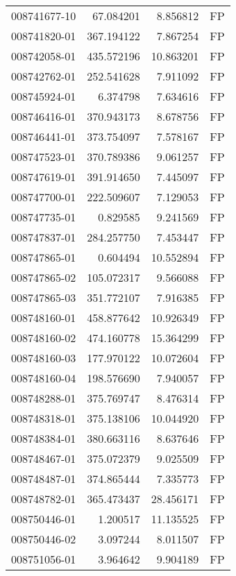 \begin{tabular}{lrrl}
008741677-10 &   67.084201 &       8.856812 &   FP \\
008741820-01 &  367.194122 &       7.867254 &   FP \\
008742058-01 &  435.572196 &      10.863201 &   FP \\
008742762-01 &  252.541628 &       7.911092 &   FP \\
008745924-01 &    6.374798 &       7.634616 &   FP \\
008746416-01 &  370.943173 &       8.678756 &   FP \\
008746441-01 &  373.754097 &       7.578167 &   FP \\
008747523-01 &  370.789386 &       9.061257 &   FP \\
008747619-01 &  391.914650 &       7.445097 &   FP \\
008747700-01 &  222.509607 &       7.129053 &   FP \\
008747735-01 &    0.829585 &       9.241569 &   FP \\
008747837-01 &  284.257750 &       7.453447 &   FP \\
008747865-01 &    0.604494 &      10.552894 &   FP \\
008747865-02 &  105.072317 &       9.566088 &   FP \\
008747865-03 &  351.772107 &       7.916385 &   FP \\
008748160-01 &  458.877642 &      10.926349 &   FP \\
008748160-02 &  474.160778 &      15.364299 &   FP \\
008748160-03 &  177.970122 &      10.072604 &   FP \\
008748160-04 &  198.576690 &       7.940057 &   FP \\
008748288-01 &  375.769747 &       8.476314 &   FP \\
008748318-01 &  375.138106 &      10.044920 &   FP \\
008748384-01 &  380.663116 &       8.637646 &   FP \\
008748467-01 &  375.072379 &       9.025509 &   FP \\
008748487-01 &  374.865444 &       7.335773 &   FP \\
008748782-01 &  365.473437 &      28.456171 &   FP \\
008750446-01 &    1.200517 &      11.135525 &   FP \\
008750446-02 &    3.097244 &       8.011507 &   FP \\
008751056-01 &    3.964642 &       9.904189 &   FP \\

\end{tabular}
